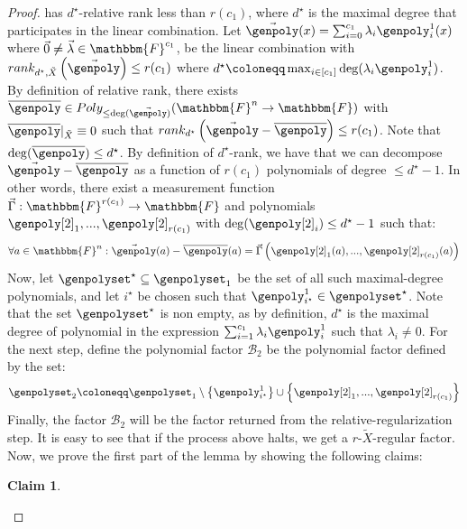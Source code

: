 \documentclass[10pt,a4paper]{article}
\newtheorem{claim}[theorem]{Claim}
\newcommand{\definedas}[0]{\coloneqq}
\newcommand{\parens}[1]{\left( #1 \right)}
\newcommand{\sparens}[1]{\left[ #1 \right]}
\newcommand{\set}[1]{\left\{ #1 \right\}}
\newcommand{\basefield}[0]{\mathbbm{F}}
\newcommand{\blocklength}[0]{n}
\newcommand{\field}[0]{\basefield^{\blocklength}}
\newcommand{\degree}[0]{d}
\newcommand{\funcdef}[3]{#1:#2\rightarrow#3}
\newcommand{\restrictfunc}[2]{#1|_{#2}}
\newcommand{\factor}[0]{\mathcal{B}}
\newcommand{\allpolyset}[3]{Poly_{#1}(#2\rightarrow#3)}
\newcommand{\relativeremainder}[1]{\overline{#1}}
\newcommand{\variety}{{\tilde{X}}}
\newcommand{\drank}[2]{rank_{#1} \parens{#2}}
\newcommand{\drelrank}[3]{rank_{{#1}, {#2}} \parens{#3}}
\newcommand{\rankfunc}[0]{{{{r}}}}
\begin{document}
\begin{proof}
    has $\degree^\star$-relative rank less than $\rankfunc(c_1)$,
    where $\degree^\star$ is the maximal degree that participates in the linear combination.
    Let $\vec{\genpoly}(x) = \sum_{i=0}^{c_1}{\lambda_i \genpoly^{1}_i(x)}$ where $\vec{0} \neq \vec{\lambda}\in \basefield^{c_1}$,
    be the linear combination with $\drelrank{\degree^\star}{\variety}{\vec{\genpoly}} \leq \rankfunc(c_1)$ where $\degree^\star \definedas \max_{i \in \sparens{c_1}}{\deg(\lambda_i \genpoly^1_i)}$.
    By definition of relative rank, there exists $\relativeremainder{\genpoly} \in \allpolyset{\leq \deg(\vec{\genpoly})}{\field}{\basefield}$ with $\restrictfunc{\relativeremainder{\genpoly}}{\variety} \equiv 0$ such that
    $\drank{\degree^\star}{\vec{\genpoly} - \relativeremainder{\genpoly}} \leq \rankfunc(c_1)$.
    Note that $\deg(\relativeremainder{\genpoly}) \leq \degree^\star$.
    By definition of $\degree^\star$-rank, we have that we can decompose $\vec{\genpoly} - \relativeremainder{\genpoly}$ as a function of $\rankfunc(c_1)$ polynomials of degree $\leq \degree^\star - 1$.
    In other words, there exist a measurement function $\funcdef{\vec{\Gamma}}{\basefield^{\rankfunc(c_1)}}{\basefield}$ and polynomials $\genpoly[2]_1,...,\genpoly[2]_{\rankfunc(c_1)}$
    with $\deg(\genpoly[2]_i) \leq \degree^\star - 1$ such that:
    \[
        \forall a \in \field: \vec{\genpoly}(a) - \relativeremainder{\genpoly}(a) = \vec{\Gamma} \parens {\genpoly[2]_1(a),...,\genpoly[2]_{\rankfunc(c_1)}(a)}
    \]
    Now, let $\genpolyset^{\star} \subseteq \genpolyset_1$ be the set of all such maximal-degree polynomials,
    and let $i^{\star}$ be chosen such that $\genpoly^{1}_{i^\star} \in \genpolyset^{\star}$.
    Note that the set $\genpolyset^\star$ is non empty, as by definition, $\degree^{\star}$ is the maximal degree of polynomial in the expression $\sum_{i=1}^{c_1}{\lambda_{i} \genpoly^{1}_i}$ such that $\lambda_i \neq 0$.
    \newline
    For the next step, define the polynomial factor $\factor_2$ be the polynomial factor defined by the set:
    \[
        \genpolyset_2 \definedas \genpolyset_1 \setminus \set{\genpoly^1_{i^\star}} \cup \set{\genpoly[2]_1,...,\genpoly[2]_{\rankfunc(c_1)}}
    \]
    Finally, the factor $\factor_2$ will be the factor returned from the relative-regularization step.
    \newline
    It is easy to see that if the process above halts, we get a $\rankfunc$-$\variety$-regular factor.
    Now, we prove the first part of the lemma by showing the following claims:
    \begin{claim}

\end{claim}
\end{proof}
\end{document}
